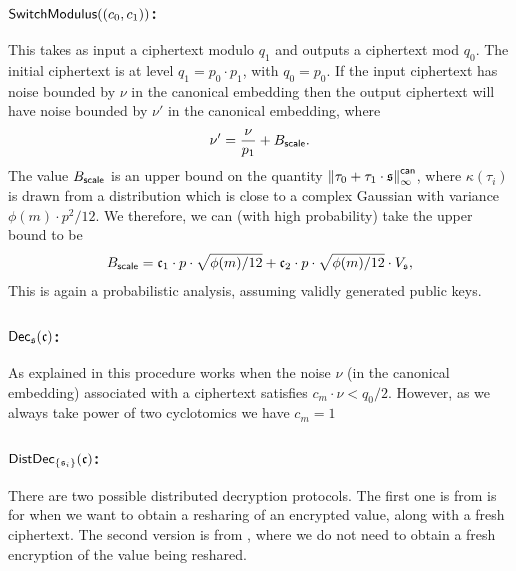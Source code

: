 \subsubsection{$\mathsf{SwitchModulus}((c_0,c_1))$:}
This takes as input a ciphertext modulo $q_1$ and outputs a ciphertext mod $q_0$.
The initial ciphertext is at level $q_1=p_0 \cdot p_1$, with $q_0=p_0$.
If the input ciphertext has noise bounded by $\nu$
in the canonical embedding
then the output ciphertext will have noise bounded by $\nu'$ in
the canonical embedding, where
\[ \nu' = \frac{\nu}{p_1} + B_{\mathsf{scale}}. \]
The value $B_{\mathsf{scale}}$ is an upper bound on the quantity
${\Vert \tau_0+\tau_1 \cdot \mathfrak{s} \Vert}_\infty^{\mathsf{can}}$, where
$\kappa(\tau_i)$ is drawn from a distribution
which is close to a complex Gaussian with variance $\phi(m)\cdot p^2/12$.
We therefore, we can (with high probability) take the upper
bound to be
\begin{align*}
  B_{\mathsf{scale}}
   & = \mathfrak{c}_1 \cdot p \cdot \sqrt{ \phi(m)/12}
  +  \mathfrak{c}_2 \cdot p \cdot \sqrt{ \phi(m)/12} \cdot V_{\mathfrak{s}}, \\
\end{align*}
This is again a probabilistic analysis, assuming validly generated
public keys.

\subsubsection{$\mathsf{Dec}_{\mathfrak{s}}(\mathfrak{c})$:}
As explained in \cite{SPDZ2,GHS12c} this procedure works when the noise
$\nu$ (in the canonical embedding) associated with a ciphertext satisfies $c_m \cdot \nu  < q_{0}/2$.
However, as we always take power of two cyclotomics we have $c_m=1$

\subsubsection{$\mathsf{DistDec}_{\{\mathfrak{s}_i\}}(\mathfrak{c})$:}
There are two possible distributed decryption protocols.
The first one is from \cite{SPDZ} is for when we want to obtain a
resharing of an encrypted value, along with a fresh ciphertext.
The second version is from \cite{KPR}, where we do not need to
obtain a fresh encryption of the value being reshared.


